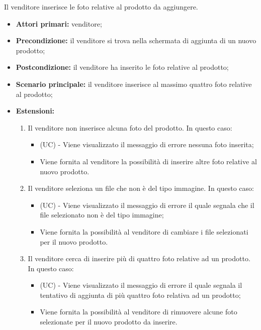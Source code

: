 Il venditore inserisce le foto relative al prodotto da aggiungere.
\begin{itemize}
    \item \textbf{Attori primari:} venditore;
    \item \textbf{Precondizione:} il venditore si trova nella schermata di aggiunta di un nuovo prodotto;
    \item \textbf{Postcondizione:} il venditore ha inserito le foto relative al prodotto;
    \item \textbf{Scenario principale:} il venditore inserisce al massimo quattro foto relative al prodotto;
    \item \textbf{Estensioni:}
    \begin{enumerate}[label=\lett]
    	\item Il venditore non inserisce alcuna foto del prodotto. In questo caso:
    	\begin{itemize}
    		\item (UC) - Viene visualizzato il messaggio di errore nessuna foto inserita;
    		\item Viene fornita al venditore la possibilità di inserire altre foto relative al nuovo prodotto.
    	\end{itemize}
    	\item Il venditore seleziona un file che non è del tipo immagine. In questo caso:
    	\begin{itemize}
    		\item (UC) - Viene visualizzato il messaggio di errore il quale segnala che il file selezionato non è del tipo immagine;
    		\item Viene fornita la possibilità al venditore di cambiare i file selezionati per il nuovo prodotto.
    	\end{itemize}
    	\item Il venditore cerca di inserire più di quattro foto relative ad un prodotto. In questo caso:
    	\begin{itemize}
    		\item (UC) - Viene visualizzato il messaggio di errore il quale segnala il tentativo di aggiunta di più quattro foto relativa ad un prodotto;
    		\item Viene fornita la possibilità al venditore di rimuovere alcune foto selezionate per il nuovo prodotto da inserire.
    	\end{itemize}
    \end{enumerate}
\end{itemize}

